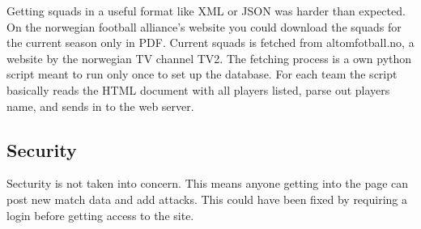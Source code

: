 Getting squads in a useful format like XML or JSON was harder than expected. On the norwegian football alliance's website you could download the squads for the current season only in PDF. Current squads is fetched from altomfotball.no, a website by the norwegian TV channel TV2. The fetching process is a own python script meant to run only once to set up the database. For each team the script basically reads the HTML document with all players listed, parse out players name, and sends in to the web server.


\subsection{Security}
Secturity is not taken into concern. This means anyone getting into the page can post new match data and add attacks. This could have been fixed by requiring a login before getting access to the site. 

